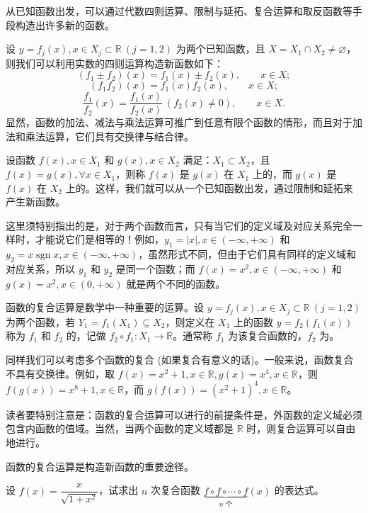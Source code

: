 \documentclass[UTF8,12pt,a4paper,fontset=fandol]{ctexbook}
\begin{document}
从已知函数出发，可以通过代数四则运算、限制与延拓、复合运算和取反函数等手段构造出许多新的函数。

\noindent{}

设 $y=f_j(x),x\in X_j\subset\mathbb{R}\ (j=1,2)$ 为两个已知函数，且 $X=X_1\cap X_2\ne\varnothing$，则我们可以利用实数的四则运算构造新函数如下：
\[
  (f_1\pm f_2)(x)=f_1(x)\pm f_2(x),\qquad x\in X;
\]
\[
  (f_1f_2)(x)=f_1(x)f_2(x),\qquad x\in X;
\]
\[
  \frac{f_1}{f_2}(x)=\frac{f_1(x)}{f_2(x)}\ (f_2(x)\ne0),\qquad x\in X.
\]
显然，函数的加法、减法与乘法运算可推广到任意有限个函数的情形，而且对于加法和乘法运算，它们具有交换律与结合律。

\noindent{}

设函数 $f(x),x\in X_1$ 和 $g(x),x\in X_2$ 满足：$X_1\subset X_2$，且 $f(x)=g(x),\forall x\in X_1$，则称 $f(x)$ 是 $g(x)$ 在 $X_1$ 上的，而 $g(x)$ 是 $f(x)$ 在 $X_2$ 上的。这样，我们就可以从一个已知函数出发，通过限制和延拓来产生新函数。

这里须特别指出的是，对于两个函数而言，只有当它们的定义域及对应关系完全一样时，才能说它们是相等的！例如，$y_1=|x|,x\in(-\infty,+\infty)$ 和 $y_2=x\operatorname{sgn}x,x\in(-\infty,+\infty)$，虽然形式不同，但由于它们具有同样的定义域和对应关系，所以 $y_1$ 和 $y_2$ 是同一个函数；而 $f(x)=x^2,x\in(-\infty,+\infty)$ 和 $g(x)=x^2,x\in(0,+\infty)$ 就是两个不同的函数。

\noindent{}

函数的复合运算是数学中一种重要的运算。设 $y=f_j(x),x\in X_j\subset\mathbb{R}\ (j=1,2)$ 为两个函数，若 $Y_1=f_1(X_1)\subseteq X_2$，则定义在 $X_1$ 上的函数 $y=f_2(f_1(x))$ 称为 $f_1$ 和 $f_2$ 的，记做 $f_2\circ f_1:X_1\to\mathbb{R}$。通常称 $f_1$ 为该复合函数的，$f_2$ 为。

同样我们可以考虑多个函数的复合 (如果复合有意义的话)。一般来说，函数复合不具有交换律。例如，取 $f(x)=x^2+1,x\in\mathbb{R},g(x)=x^4,x\in\mathbb{R}$，则 $f(g(x))=x^8+1,x\in\mathbb{R}$，而 $g(f(x))=(x^2+1)^4,x\in\mathbb{R}$。

读者要特别注意是：函数的复合运算可以进行的前提条件是，外函数的定义域必须包含内函数的值域。当然，当两个函数的定义域都是 $\mathbb{R}$ 时，则复合运算可以自由地进行。

函数的复合运算是构造新函数的重要途径。

\noindent{}\quad 设 $f(x)=\dfrac{x}{\sqrt{1+x^2}}$，试求出 $n$ 次复合函数 $\underbrace{f\circ f\circ\cdots\circ f}_{n\text{ 个}}(x)$ 的表达式。
\end{document}
